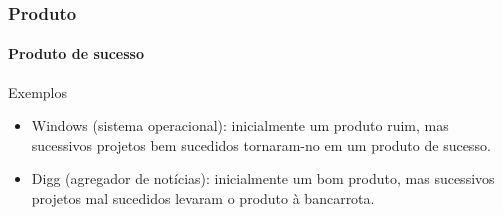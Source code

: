 \begin{frame}
	\frametitle{Produto}
	\framesubtitle{Produto de sucesso}

	
	\begin{block:ie}{Exemplos}
		\begin{itemize}
			\item Windows (sistema operacional): inicialmente um produto ruim, mas sucessivos projetos bem sucedidos tornaram-no em um produto de sucesso.
	
			\item Digg (agregador de notícias): inicialmente um bom produto, mas sucessivos projetos mal sucedidos levaram o produto à bancarrota.
		\end{itemize}

	\end{block:ie}
\end{frame}

